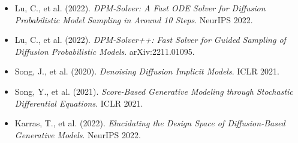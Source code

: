 \documentclass[a4paper]{article}
\begin{document}
\begin{itemize}
    \item Lu, C., et al. (2022). \textit{DPM-Solver: A Fast ODE Solver for Diffusion Probabilistic Model Sampling in Around 10 Steps}. NeurIPS 2022.
    \item Lu, C., et al. (2022). \textit{DPM-Solver++: Fast Solver for Guided Sampling of Diffusion Probabilistic Models}. arXiv:2211.01095.
    \item Song, J., et al. (2020). \textit{Denoising Diffusion Implicit Models}. ICLR 2021.
    \item Song, Y., et al. (2021). \textit{Score-Based Generative Modeling through Stochastic Differential Equations}. ICLR 2021.
    \item Karras, T., et al. (2022). \textit{Elucidating the Design Space of Diffusion-Based Generative Models}. NeurIPS 2022.
\end{itemize}

\end{document}
